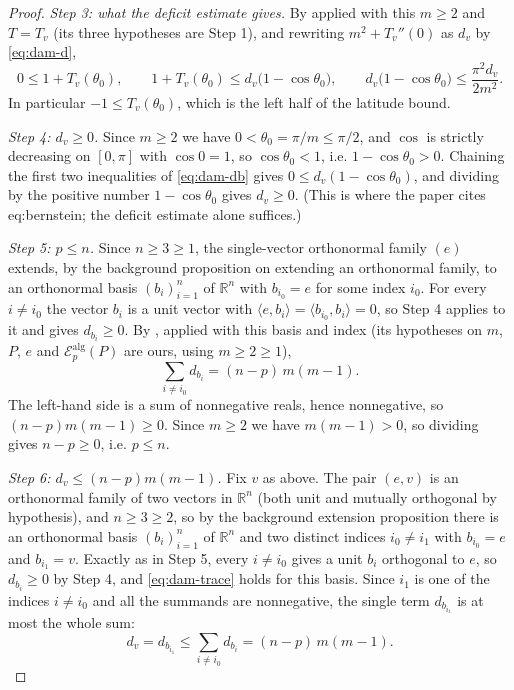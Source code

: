 \begin{proof}
\emph{Step 3: what the deficit estimate gives.} By 
applied with this $m\ge2$ and $T=T_v$ (its three hypotheses are Step 1), and
rewriting $m^2+T_v''(0)$ as $d_v$ by \eqref{eq:dam-d},
\begin{equation}\label{eq:dam-db}
  0\le1+T_v(\theta_0),
  \qquad
  1+T_v(\theta_0)\le d_v\bigl(1-\cos\theta_0\bigr),
  \qquad
  d_v\bigl(1-\cos\theta_0\bigr)\le\frac{\pi^2d_v}{2m^2}.
\end{equation}
In particular $-1\le T_v(\theta_0)$, which is the left half of the latitude
bound.

\emph{Step 4: $d_v\ge0$.} Since $m\ge2$ we have $0<\theta_0=\pi/m\le\pi/2$, and
$\cos$ is strictly decreasing on $[0,\pi]$ with $\cos0=1$, so $\cos\theta_0<1$,
i.e. $1-\cos\theta_0>0$. Chaining the first two inequalities of
\eqref{eq:dam-db} gives $0\le d_v(1-\cos\theta_0)$, and dividing by the positive
number $1-\cos\theta_0$ gives $d_v\ge0$. (This is where the paper cites
eq:bernstein; the deficit estimate alone suffices.)

\emph{Step 5: $p\le n$.} Since $n\ge3\ge1$, the single-vector orthonormal family
$(e)$ extends, by the background proposition on extending an orthonormal family,
to an orthonormal basis $(b_i)_{i=1}^{n}$ of $\mathbb{R}^n$ with $b_{i_0}=e$ for
some index $i_0$. For every $i\ne i_0$ the vector $b_i$ is a unit vector with
$\langle e,b_i\rangle=\langle b_{i_0},b_i\rangle=0$, so Step 4 applies to it and
gives $d_{b_i}\ge0$. By , applied with this basis and
index (its hypotheses on $m$, $P$, $e$ and $\mathcal{E}^{\mathrm{alg}}_p(P)$ are
ours, using $m\ge2\ge1$),
\begin{equation}\label{eq:dam-trace}
  \sum_{i\ne i_0}d_{b_i}=(n-p)\,m(m-1).
\end{equation}
The left-hand side is a sum of nonnegative reals, hence nonnegative, so
$(n-p)m(m-1)\ge0$. Since $m\ge2$ we have $m(m-1)>0$, so dividing gives
$n-p\ge0$, i.e. $p\le n$.

\emph{Step 6: $d_v\le(n-p)m(m-1)$.} Fix $v$ as above. The pair $(e,v)$ is an
orthonormal family of two vectors in $\mathbb{R}^n$ (both unit and mutually
orthogonal by hypothesis), and $n\ge3\ge2$, so by the background extension
proposition there is an orthonormal basis $(b_i)_{i=1}^{n}$ of $\mathbb{R}^n$
and two distinct indices $i_0\ne i_1$ with $b_{i_0}=e$ and $b_{i_1}=v$. Exactly
as in Step 5, every $i\ne i_0$ gives a unit $b_i$ orthogonal to $e$, so
$d_{b_i}\ge0$ by Step 4, and \eqref{eq:dam-trace} holds for this basis. Since
$i_1$ is one of the indices $i\ne i_0$ and all the summands are nonnegative, the
single term $d_{b_{i_1}}$ is at most the whole sum:
\[
  d_v=d_{b_{i_1}}\le\sum_{i\ne i_0}d_{b_i}=(n-p)\,m(m-1).
\]


\end{proof}

